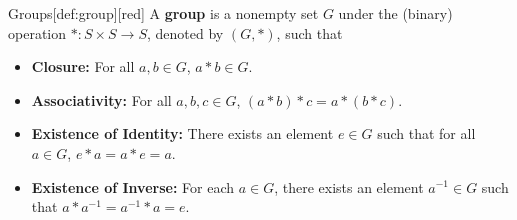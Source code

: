 \begin{define}{Groups}[def:group][red]
  A \textbf{group} is a nonempty set \(G\) under the (binary) 
  operation \(*: S \times S \to S\), denoted by \((G, *)\), such that
  \begin{itemize}
    \item \textbf{Closure:} For all \(a, b \in G\), \(a * b \in G\).
    \item \textbf{Associativity:} For all \(a, b, c \in G\), \((a * b) * c = a * (b * c)\).
    \item \textbf{Existence of Identity:} There exists an element \(e \in G\) 
    such that for all \(a \in G\), \(e * a = a * e = a\).
    \item \textbf{Existence of Inverse:} For each \(a \in G\), there exists an 
    element \(a^{-1} \in G\) such that \(a * a^{-1} = a^{-1} * a = e\).
  \end{itemize}
\end{define}

